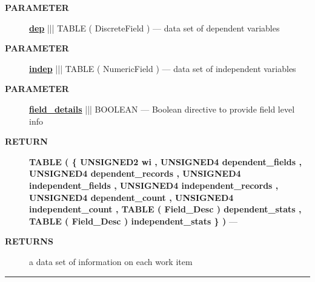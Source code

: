 \par
\begin{description}
\item [\colorbox{tagtype}{\color{white} \textbf{\textsf{PARAMETER}}}] \textbf{\underline{dep}} ||| TABLE ( DiscreteField ) --- data set of dependent variables
\item [\colorbox{tagtype}{\color{white} \textbf{\textsf{PARAMETER}}}] \textbf{\underline{indep}} ||| TABLE ( NumericField ) --- data set of independent variables
\item [\colorbox{tagtype}{\color{white} \textbf{\textsf{PARAMETER}}}] \textbf{\underline{field\_details}} ||| BOOLEAN --- Boolean directive to provide field level info
\end{description}







\par
\begin{description}
\item [\colorbox{tagtype}{\color{white} \textbf{\textsf{RETURN}}}] \textbf{TABLE ( \{ UNSIGNED2 wi , UNSIGNED4 dependent\_fields , UNSIGNED4 dependent\_records , UNSIGNED4 independent\_fields , UNSIGNED4 independent\_records , UNSIGNED4 dependent\_count , UNSIGNED4 independent\_count , TABLE ( Field\_Desc ) dependent\_stats , TABLE ( Field\_Desc ) independent\_stats \} )} --- 
\end{description}






\par
\begin{description}
\item [\colorbox{tagtype}{\color{white} \textbf{\textsf{RETURNS}}}] a data set of information on each work item
\end{description}




\rule{\linewidth}{0.5pt}
